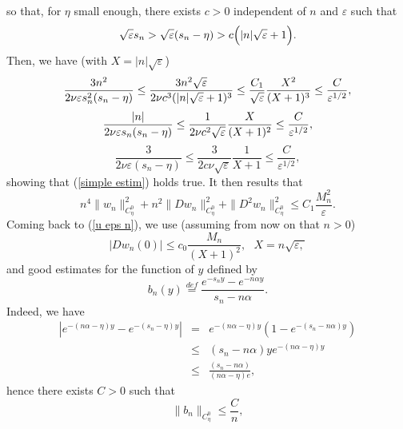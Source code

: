 \documentclass[11pt]{article}
\begin{document}
so that, for $\eta $ small enough, there exists $c>0$ independent of $n$ and $%
\varepsilon $ such that%
\begin{equation*}
\sqrt{\varepsilon }s_{n}>\sqrt{\varepsilon }(s_{n}-\eta )>c \Bigl( |n|\sqrt{\varepsilon 
}+1 \Bigr).
\end{equation*}%
Then, we have (with $X=|n|\sqrt{\varepsilon }$) 
\begin{equation*}
\frac{3n^{2}}{2\nu \varepsilon s_{n}^{2}(s_{n}-\eta )}\leq \frac{3n^{2}\sqrt{%
\varepsilon }}{2\nu c^{3}(|n|\sqrt{\varepsilon }+1)^{3}}\leq \frac{C_{1}}{%
\sqrt{\varepsilon }}\frac{X^{2}}{(X+1)^{3}}\leq \frac{C}{\varepsilon ^{1/2}},
\end{equation*}%
\begin{equation*}
\frac{|n|}{2\nu \varepsilon s_{n}(s_{n}-\eta )}\leq \frac{1}{2\nu c^{2}\sqrt{%
\varepsilon }}\frac{X}{(X+1)^{2}}\leq \frac{C}{\varepsilon ^{1/2}},
\end{equation*}%
\begin{equation*}
\frac{3}{2\nu \varepsilon (s_{n}-\eta )}\leq \frac{3}{2c\nu \sqrt{\varepsilon }}%
\frac{1}{X+1}\leq \frac{C}{\varepsilon ^{1/2}},
\end{equation*}%
showing that (\ref{simple estim}) holds true. It then results that%
\begin{equation*}
n^{4}\|w_{n}\|_{C_{\eta}^{0}}^{2}+n^{2}\|Dw_{n}\|_{C_{\eta}^{0}}^{2}+\|D^{2}w_{n}\|_{C_{\eta}^{0}}^{2}\leq C_{1}%
\frac{M_{n}^{2}}{\varepsilon }.
\end{equation*}%
Coming back to (\ref{u eps n}), we use (assuming from now on that $n>0$) 
\begin{equation*}
|Dw_{n}(0)|\leq c_{0}\frac{M_{n}}{(X+1)^{2}},\text{ }X=n\sqrt{\varepsilon ,}
\end{equation*}%
and good estimates for the function of $y$ defined by%
\begin{equation*}
b_{n}(y)\overset{def}{=}\frac{e^{-s_{n}y}-e^{-n\alpha y}}{s_{n}-n\alpha }.
\end{equation*}%
Indeed, we have%
\begin{eqnarray*}
|e^{-(n\alpha -\eta )y}-e^{-(s_{n}-\eta )y}| &=&e^{-(n\alpha
-\eta )y}(1-e^{-(s_{n}-n\alpha )y}) \\
&\leq &(s_{n}-n\alpha )ye^{-(n\alpha -\eta )y} \\
&\leq &\frac{(s_{n}-n\alpha )}{(n\alpha -\eta )e},
\end{eqnarray*}%
hence there exists $C>0$ such that%
\begin{equation*}
\|b_{n}\|_{C_{\eta}^{0}}\leq \frac{C}{n},
\end{equation*}%
\end{document}
